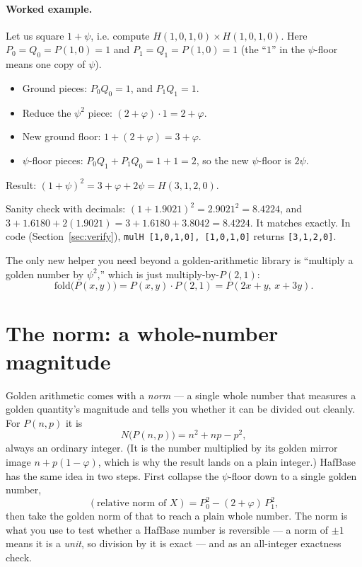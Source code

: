 \documentclass[11pt]{article}
\newcommand{\phigr}{\varphi}
\newcommand{\Hn}[4]{H(#1,#2,#3,#4)}
\newcommand{\Pn}[2]{P(#1,#2)}
\begin{document}
\paragraph{Worked example.} Let us square $1 + \psi$, i.e. compute $\Hn{1}{0}{1}{0}\times\Hn{1}{0}{1}{0}$.
Here $P_0 = Q_0 = \Pn{1}{0} = 1$ and $P_1 = Q_1 = \Pn{1}{0} = 1$ (the ``$1$'' in the $\psi$-floor
means one copy of $\psi$).
\begin{itemize}
\item Ground pieces: $P_0Q_0 = 1$, and $P_1Q_1 = 1$.
\item Reduce the $\psi^2$ piece: $(2+\phigr)\cdot 1 = 2 + \phigr$.
\item New ground floor: $1 + (2 + \phigr) = 3 + \phigr$.
\item $\psi$-floor pieces: $P_0Q_1 + P_1Q_0 = 1 + 1 = 2$, so the new $\psi$-floor is $2\psi$.
\end{itemize}
Result: $(1+\psi)^2 = 3 + \phigr + 2\psi = \Hn{3}{1}{2}{0}$.

Sanity check with decimals: $(1 + 1.9021)^2 = 2.9021^2 = 8.4224$, and
$3 + 1.6180 + 2(1.9021) = 3 + 1.6180 + 3.8042 = 8.4224$. It matches exactly. In code
(Section~\ref{sec:verify}), \verb|mulH [1,0,1,0], [1,0,1,0]| returns \verb|[3,1,2,0]|.

The only new helper you need beyond a golden-arithmetic library is ``multiply a golden number by
$\psi^2$,'' which is just multiply-by-$\Pn{2}{1}$:
\[
\mathrm{fold}\big(\Pn{x}{y}\big) = \Pn{x}{y}\cdot\Pn{2}{1} = \Pn{2x + y}{\,x + 3y}.
\]

\section{The norm: a whole-number magnitude}

Golden arithmetic comes with a \emph{norm} --- a single whole number that measures a golden quantity's
magnitude and tells you whether it can be divided out cleanly. For $\Pn{n}{p}$ it is
\[
N\big(\Pn{n}{p}\big) = n^2 + np - p^2,
\]
always an ordinary integer. (It is the number multiplied by its golden mirror image $n + p(1-\phigr)$,
which is why the result lands on a plain integer.) HafBase has the same idea in two steps. First collapse
the $\psi$-floor down to a single golden number,
\[
(\text{relative norm of } X) = P_0^2 - (2 + \phigr)\,P_1^2 ,
\]
then take the golden norm of that to reach a plain whole number. The norm is what you use to test whether
a HafBase number is reversible --- a norm of $\pm 1$ means it is a \emph{unit}, so division by it is exact
--- and as an all-integer exactness check.
\end{document}
